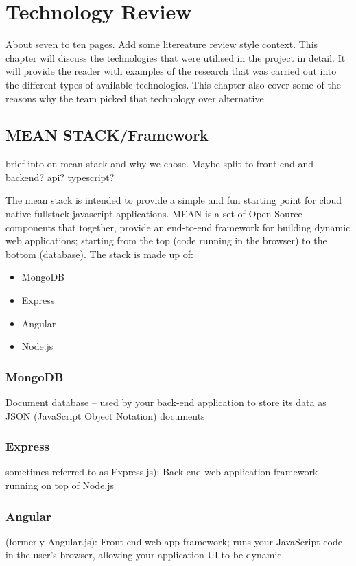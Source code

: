 \chapter{Technology Review}
About seven to ten pages. Add some litereature review style context.
This chapter will discuss the technologies that were utilised in the project in detail. It will provide the reader with examples of the research that was carried out into the diﬀerent types of available technologies. This chapter also cover some of the reasons why the team picked that technology over alternative

\section{MEAN STACK/Framework}
brief into on mean stack and why we chose. Maybe split to front end and backend?
api?
typescript?

The mean stack is intended to provide a simple and fun starting point for cloud native fullstack javascript applications.
MEAN is a set of Open Source components that together, provide an end-to-end framework for building dynamic web applications; starting from the top (code running in the browser) to the bottom (database). The stack is made up of:
\begin{itemize}
\item MongoDB
\item Express
\item Angular
\item Node.js

\end{itemize}

\subsection{MongoDB}
Document database – used by your back-end application to store its data as JSON (JavaScript Object Notation) documents

\subsection{Express}
sometimes referred to as Express.js): Back-end web application framework running on top of Node.js

\subsection{Angular}
(formerly Angular.js): Front-end web app framework; runs your JavaScript code in the user’s browser, allowing your application UI to be dynamic

